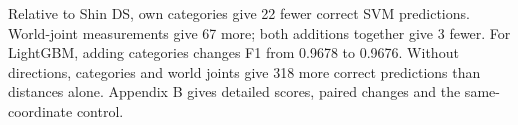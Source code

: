 Relative to Shin DS, own categories give 22 fewer correct SVM predictions. World-joint measurements give 67 more; both additions together give 3 fewer. For LightGBM, adding categories changes F1 from 0.9678 to 0.9676. Without directions, categories and world joints give 318 more correct predictions than distances alone. Appendix B gives detailed scores, paired changes and the same-coordinate control.
